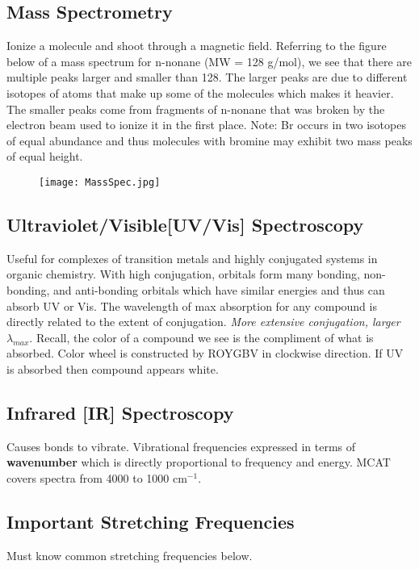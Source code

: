 \documentclass[../OChemReview.tex]{subfiles}
\begin{document}
	\subsection{Mass Spectrometry}
	
	Ionize a molecule and shoot through a magnetic field. Referring to the figure below of a mass spectrum for n-nonane (MW = 128 g/mol), we see that there are multiple peaks larger and smaller than 128. The larger peaks are due to different isotopes of atoms that make up some of the molecules which makes it heavier. The smaller peaks come from fragments of n-nonane that was broken by the electron beam used to ionize it in the first place. Note: Br occurs in two isotopes of equal abundance and thus molecules with bromine may exhibit two mass peaks of equal height.
	
	\begin{figure}[h]
		\centering
		\texttt{[image: MassSpec.jpg]}
	\end{figure}
	\newpage
	\subsection{Ultraviolet/Visible[UV/Vis] Spectroscopy}
	
	Useful for complexes of transition metals and highly conjugated systems in organic chemistry. With high conjugation, orbitals form many bonding, non-bonding, and anti-bonding orbitals which have similar energies and thus can absorb UV or Vis. The wavelength of max absorption for any compound is directly related to the extent of conjugation. \emph{More extensive conjugation, larger $ \lambda_{max} $}. Recall, the color of a compound we see is the compliment of what is absorbed. Color wheel is constructed by ROYGBV in clockwise direction. If UV is absorbed then compound appears white.
	
	\subsection{Infrared [IR] Spectroscopy}
	
	Causes bonds to vibrate. Vibrational frequencies expressed in terms of \textbf{wavenumber} which is directly proportional to frequency and energy. MCAT covers spectra from 4000 to 1000 cm$ ^{-1} $. 
	
	\subsection*{Important Stretching Frequencies}
	Must know common stretching frequencies below.
	
\end{document}
